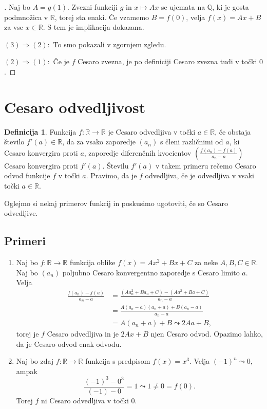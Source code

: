 \documentclass[a4paper,12pt]{article}
\theoremstyle{definition}
\newtheorem{definicija}{Definicija}
\theoremstyle{plain}
\newenvironment{dokaz}{\begin{proof}[\bfseries\upshape\proofname]}{\end{proof}}
\begin{document}
\begin{dokaz}
    Naj bo $A = g(1)$. Zvezni funkciji $g$ in $x \mapsto Ax$ se ujemata na $\mathbb{Q}$, ki je gosta podmnožica v $\mathbb{R}$, torej sta enaki. Če vzamemo $B = f(0)$, velja $f(x) = Ax + B$ za vse $x \in \mathbb{R}$. S tem je implikacija dokazana.

    $(3) \Rightarrow (2): $ To smo pokazali v zgornjem zgledu.

    $(2) \Rightarrow (1): $ Če je $f$ Cesaro zvezna, je po definiciji Cesaro zvezna tudi v točki $0$.
\end{dokaz}


\section{Cesaro odvedljivost}
\begin{definicija}
    Funkcija $f: \mathbb{R} \rightarrow \mathbb{R}$ je Cesaro odvedljiva v točki $a \in \mathbb{R}$, če obstaja število $f'(a) \in \mathbb{R}$, da za vsako zaporedje $(a_n)$ s členi različnimi od $a$, ki Cesaro konvergira proti $a$, zaporedje diferenčnih kvocientov $(\frac{f(a_n)-f(a)}{a_n-a})$ Cesaro konvergira proti $f'(a)$. Številu $f'(a)$ v takem primeru rečemo Cesaro odvod funkcije $f$ v točki $a$. Pravimo, da je $f$ odvedljiva, če je odvedljiva v vsaki točki $a \in \mathbb{R}$.
\end{definicija}

Oglejmo si nekaj primerov funkcij in poskusimo ugotoviti, če so Cesaro odvedljive.

\subsection*{Primeri}
\begin{enumerate}
    \item Naj bo $f: \mathbb{R} \rightarrow \mathbb{R}$ funkcija oblike $f(x) = Ax^2 + Bx + C$ za neke $A, B, C \in \mathbb{R}$. Naj bo $(a_n)$ poljubno Cesaro konvergentno zaporedje s Cesaro limito $a$. Velja 
    \begin{align*}
        \frac{f(a_n)-f(a)}{a_n-a} &= \frac{(Aa_n^2 + Ba_n + C)-(Aa^2 + Ba + C)}{a_n-a}\\
        &= \frac{A(a_n-a)(a_n+a) + B(a_n-a)}{a_n-a}\\
        &= A(a_n+a) + B \leadsto 2Aa + B,
    \end{align*}
    torej je $f$ Cesaro odvedljiva in je $2Ax + B$ njen Cesaro odvod. Opazimo lahko, da je Cesaro odvod enak odvodu.
    \item Naj bo zdaj $f: \mathbb{R} \rightarrow \mathbb{R}$ funkcija s predpisom $f(x) = x^3$. Velja $(-1)^n \leadsto 0$, ampak $$\frac{(-1)^3-0^3}{(-1)-0} = 1 \leadsto 1 \neq 0 = f(0).$$ Torej $f$ ni Cesaro odvedljiva v točki 0.
\end{enumerate}
\end{document}
